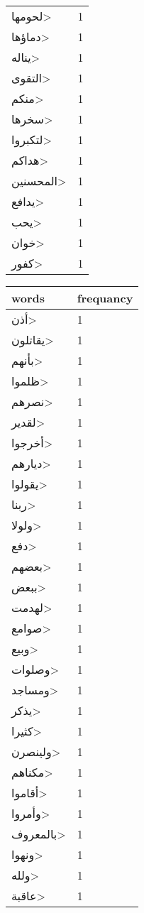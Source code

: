 \documentclass{article}
\begin{document}
\begin{multicols}{3}
\begin{center}
\begin{tabular}{ P{2cm}  P{1cm}}
\<لحومها> & 1 \\ 
\<دماؤها> & 1 \\ 
\<يناله> & 1 \\ 
\<التقوى> & 1 \\ 
\<منكم> & 1 \\ 
\<سخرها> & 1 \\ 
\<لتكبروا> & 1 \\ 
\<هداكم> & 1 \\ 
\<المحسنين> & 1 \\ 
\<يدافع> & 1 \\ 
\<يحب> & 1 \\ 
\<خوان> & 1 \\ 
\<كفور> & 1 \\ 
\end{tabular} 
\begin{tabular}{ P{2cm}  P{1cm}} 
\textbf{words}    & \textbf{frequancy}  \\
\hline
\<أذن> & 1 \\ 
\<يقاتلون> & 1 \\ 
\<بأنهم> & 1 \\ 
\<ظلموا> & 1 \\ 
\<نصرهم> & 1 \\ 
\<لقدير> & 1 \\ 
\<أخرجوا> & 1 \\ 
\<ديارهم> & 1 \\ 
\<يقولوا> & 1 \\ 
\<ربنا> & 1 \\ 
\<ولولا> & 1 \\ 
\<دفع> & 1 \\ 
\<بعضهم> & 1 \\ 
\<ببعض> & 1 \\ 
\<لهدمت> & 1 \\ 
\<صوامع> & 1 \\ 
\<وبيع> & 1 \\ 
\<وصلوات> & 1 \\ 
\<ومساجد> & 1 \\ 
\<يذكر> & 1 \\ 
\<كثيرا> & 1 \\ 
\<ولينصرن> & 1 \\ 
\<مكناهم> & 1 \\ 
\<أقاموا> & 1 \\ 
\<وأمروا> & 1 \\ 
\<بالمعروف> & 1 \\ 
\<ونهوا> & 1 \\ 
\<ولله> & 1 \\ 
\<عاقبة> & 1 \\ 

\end{tabular}
\end{center}
\end{multicols}
\end{document}
